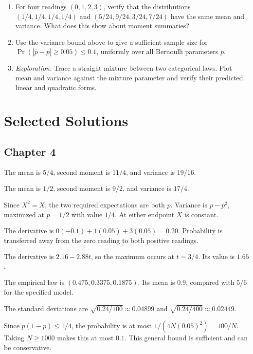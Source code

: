 \documentclass[11pt,oneside,openany]{book}
\theoremstyle{definition}
\theoremstyle{remark}
\newenvironment{exercises}{\begin{enumerate}[label=\thechapter.\arabic*,ref=\thechapter.\arabic*,leftmargin=2.8em,itemsep=6pt]}{\end{enumerate}}
\newenvironment{answers}{\begin{description}[leftmargin=2.9em,labelwidth=2.5em,labelsep=.4em,itemsep=8pt,font=\normalfont\bfseries]}{\end{description}}
\numberwithin{equation}{chapter}
\begin{document}
\begin{exercises}
\item For four readings $(0,1,2,3)$, verify that the distributions $(1/4,1/4,1/4,1/4)$ and $(5/24,9/24,3/24,7/24)$ have the same mean and variance. What does this show about moment summaries?
\item Use the variance bound above to give a sufficient sample size for $\Pr(|\widehat p-p|\geq0.05)\leq0.1$, uniformly over all Bernoulli parameters $p$.
\item \emph{Exploration.} Trace a straight mixture between two categorical laws. Plot mean and variance against the mixture parameter and verify their predicted linear and quadratic forms.
\end{exercises}

\clearpage\backmatter
\chapter*{Selected Solutions}
\section*{Chapter 4}
\begin{answers}
\item[4.1] The mean is $5/4$, second moment is $11/4$, and variance is $19/16$.
\item[4.3] The mean is $1/2$, second moment is $9/2$, and variance is $17/4$.
\item[4.5] Since $X^2=X$, the two required expectations are both $p$. Variance is $p-p^2$, maximized at $p=1/2$ with value $1/4$. At either endpoint $X$ is constant.
\item[4.7] The derivative is $0(-0.1)+1(0.05)+3(0.05)=0.20$. Probability is transferred away from the zero reading to both positive readings.
\item[4.9] The derivative is $2.16-2.88t$, so the maximum occurs at $t=3/4$. Its value is $1.65$.
\item[4.11] The empirical law is $(0.475,0.3375,0.1875)$. Its mean is $0.9$, compared with $5/6$ for the specified model.
\item[4.13] The standard deviations are $\sqrt{0.24/100}\approx0.04899$ and $\sqrt{0.24/400}\approx0.02449$.
\item[4.17] Since $p(1-p)\leq1/4$, the probability is at most $1/(4N(0.05)^2)=100/N$. Taking $N\geq1000$ makes this at most $0.1$. This general bound is sufficient and can be conservative.
\end{answers}
\end{document}

